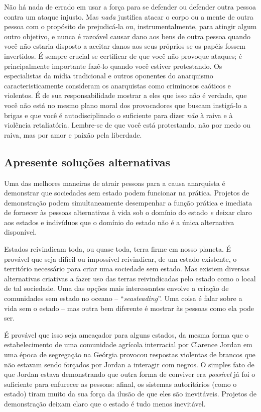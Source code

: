 Não há nada de errado em usar a força para se defender ou defender outra pessoa contra um ataque injusto. Mas \emph{nada} justifica atacar o corpo ou a mente de outra pessoa com o propósito de prejudicá-la ou, instrumentalmente, para atingir algum outro objetivo, e nunca é razoável causar dano aos bens de outra pessoa quando você não estaria disposto a aceitar danos aos seus próprios se os papéis fossem invertidos. É sempre crucial se certificar de que você não provoque ataques; é principalmente importante fazê-lo quando você estiver protestando. Os especialistas da mídia tradicional e outros oponentes do anarquismo caracteristicamente consideram os anarquistas como criminosos caóticos e violentos. É de sua responsabilidade mostrar a eles que isso não é verdade, que você não está no mesmo plano moral dos provocadores que buscam instigá-lo a brigas e que você é autodisciplinado o suficiente para dizer \emph{não} à raiva e à violência retaliatória. Lembre-se de que você está protestando, não por medo ou raiva, mas por amor e paixão pela liberdade.

\subsection*{Apresente soluções alternativas}

Uma das melhores maneiras de atrair pessoas para a causa anarquista é demonstrar que sociedades sem estado podem funcionar na prática. Projetos de demonstração podem simultaneamente desempenhar a função prática e imediata de fornecer às pessoas alternativas à vida sob o domínio do estado \emph{e} deixar claro aos estados e indivíduos que o domínio do estado não é a única alternativa disponível.

Estados reivindicam toda, ou quase toda, terra firme em nosso planeta. É provável que seja difícil ou impossível reivindicar, de um estado existente, o território necessário para criar uma sociedade sem estado. Mas existem diversas alternativas criativas a fazer uso das terras reivindicadas pelo estado como o local de tal sociedade. Uma das opções mais interessantes envolve a criação de comunidades sem estado no oceano -- ``\emph{seasteading}''. Uma coisa é falar sobre a vida sem o estado -- mas outra bem diferente é mostrar às pessoas como ela pode ser.

É provável que isso seja ameaçador para alguns estados, da mesma forma que o estabelecimento de uma comunidade agrícola interracial por Clarence Jordan em uma época de segregação na Geórgia provocou respostas violentas de brancos que não estavam sendo forçados por Jordan a interagir com negros. O simples fato de que Jordan estava demonstrando que outra forma de conviver era \emph{possível} já foi o suficiente para enfurecer as pessoas: afinal, os sistemas autoritários (como o estado) tiram muito da sua força da ilusão de que eles são inevitáveis. Projetos de demonstração deixam claro que o estado é tudo menos inevitável.

